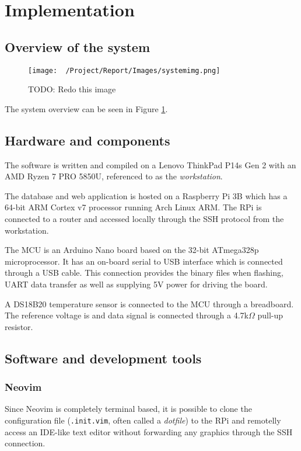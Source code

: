 \section{Implementation}%
\label{sec:implementation}

\subsection{Overview of the system}%
\label{sub:overview_of_the_system}
\begin{figure}[h]
  \centering
  \texttt{[image: ~/Project/Report/Images/systemimg.png]}
  \caption{TODO: Redo this image}
  \label{fig:systemimg}
\end{figure}
The system overview can be seen in Figure \ref{fig:systemimg}. 
\subsection{Hardware and components}%
\label{sub:hardware_and_components}

The software is written and compiled on a Lenovo ThinkPad P14s Gen 2 with an AMD Ryzen 7 PRO 5850U, referenced to as the \textit{workstation}.

The database and web application is hosted on a Raspberry Pi 3B which has a 64-bit ARM Cortex v7 processor running Arch Linux ARM. The RPi is connected to a router and accessed locally through the SSH protocol from the workstation.

The MCU is an Arduino Nano board based on the 32-bit ATmega328p microprocessor. It has an on-board serial to USB interface which is connected through a USB cable. This connection provides the binary files when flashing, UART data transfer as well as supplying 5V power for driving the board.

A DS18B20 temperature sensor is connected to the MCU through a breadboard. The reference voltage is and data signal is connected through a 4.7k$\Omega$ pull-up resistor.

\subsection{Software and development tools}%
\label{sub:software_and_development_tools}
\subsubsection{Neovim}%
\label{ssub:neovim}
Since Neovim is completely terminal based, it is possible to clone the configuration file (\verb|.init.vim|, often called a \textit{dotfile}) to the RPi and remotelly access an IDE-like text editor without forwarding any graphics through the SSH connection.

